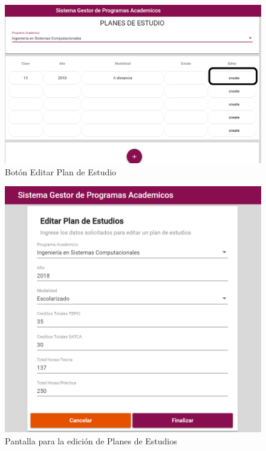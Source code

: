 \begin{figure}[!hbtp]
	\centering
	\hypertarget{editar}{\includegraphics[width=0.7\linewidth]{images/SP4-GPE/editarC}}
	\caption{Botón Editar Plan de Estudio}
	\label{editar}
\end{figure}

\begin{figure}[!hbtp]
	\centering
	\hypertarget{editarPE}{\includegraphics[width=0.7\linewidth]{images/SP4-GPE/editarPE}}
	\caption{Pantalla para la edición de Planes de Estudios}
	\label{editarPE}
\end{figure}

